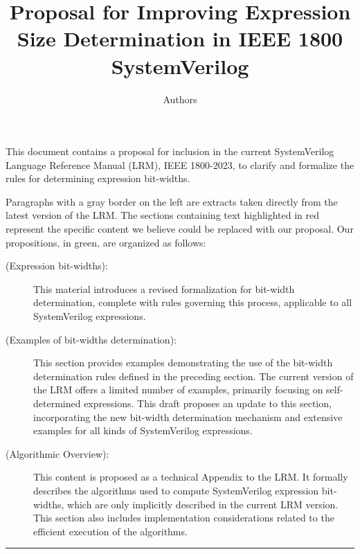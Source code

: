 \documentclass{article}
\title{Proposal for Improving Expression Size Determination in IEEE 1800
  SystemVerilog}
\author{Authors}
\date{}
\newcommand{\del}{\color{darkred}}
\newcommand{\add}{\color{darkgreen}}
\begin{document}
\maketitle

This document contains a proposal for inclusion in the current SystemVerilog
Language Reference Manual (LRM), IEEE 1800-2023, to clarify and formalize the
rules for determining expression bit-widths.

Paragraphs with a gray border on the left are extracts taken directly from the
latest version of the LRM. The sections containing text highlighted in
  {\del{}red} represent the specific content we believe could be replaced
with our proposal. Our propositions, in {\add green}, are organized as follows:

\begin{description}
  \item[ (Expression bit-widths):]
    This material introduces a revised formalization for bit-width
    determination, complete with rules governing this process, applicable to
    all SystemVerilog expressions.

  \item[ (Examples of bit-widths determination):]
    This section provides examples demonstrating the use of the bit-width
    determination rules defined in the preceding section. The current
    version of the LRM offers a limited number of examples, primarily
    focusing on self-determined expressions. This draft proposes an update
    to this section, incorporating the new bit-width determination mechanism
    and extensive examples for all kinds of SystemVerilog expressions.

  \item[ (Algorithmic Overview):]
    This content is proposed as a technical Appendix to the LRM. It formally
    describes the algorithms used to compute SystemVerilog expression
    bit-widths, which are only implicitly described in the current LRM
    version. This section also includes implementation considerations
    related to the efficient execution of the algorithms.
\end{description}

\begin{center}
  \noindent\rule{.8\textwidth}{1pt}
\end{center}

\renewcommand{\thesection}{11.4.\arabic{section}}
\setcounter{section}{3}
\end{document}

